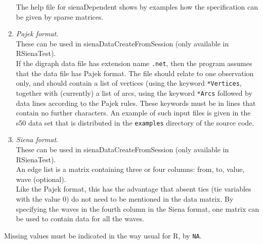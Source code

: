 \documentclass[a4paper,fleqn,11pt]{article}
\newcommand{\+}{\, + \,}
\newcommand{\sfn}[1]{\textsf{#1}}
\newcommand{\Rn}{{\sf R}}
\newcommand{\rst}{{\sf RSienaTest}}
\begin{document}
\begin{enumerate}
      The help file for \sfn{sienaDependent} shows by examples how the
      specification can be given by sparse matrices.
    \item \emph{Pajek format}.\\
      These can be used in \sfn{sienaDataCreateFromSession}
      (only available in \rst).\\
      If the digraph data file has extension name \texttt{.net}, then the
      program assumes that the data file has Pajek format.
      The file should relate to one observation only,
      and should contain a list of vertices (using the
      keyword \texttt{*Vertices}, together with (currently) a list of arcs,
      using the keyword \texttt{*Arcs}
      followed by data lines according to the Pajek rules.
      These keywords must be in lines that contain no further characters.
      An example of such input files is given in the s50 data set
      that is distributed in the \texttt{examples} directory of the
      source code.
    \item \emph{Siena format}.\\
      These can be used in \sfn{sienaDataCreateFromSession} (only available in \rst).\\
      An edge list is a matrix containing three or four columns:
      from, to, value, wave (optional).\\
      Like the Pajek format, this has the advantage that absent ties (tie
      variables with the value 0) do not need to be mentioned in the data
      matrix. By specifying the waves in the fourth column in the
      \sfn{Siena} format, one matrix can be used to contain data for all
      the waves.

\end{enumerate}

Missing values must be indicated in the way usual for \Rn,
by \texttt{NA}.

\end{document}
